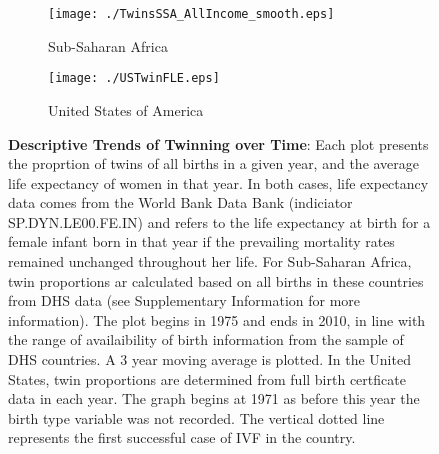 \documentclass{nature}
\begin{document}
\begin{linenumbers}
\begin{spacing}{1}
\begin{figure}[htpb!]
\begin{subfigure}{.5\textwidth}
  \texttt{[image: ./TwinsSSA\_AllIncome\_smooth.eps]}
   \caption{Sub-Saharan Africa}
\end{subfigure}%
\begin{subfigure}{.5\textwidth}
  \texttt{[image: ./USTwinFLE.eps]}
  \caption{United States of America}
\end{subfigure}
\caption{\textbf{Descriptive Trends of Twinning over Time}: {\footnotesize Each plot presents the proprtion of
twins of all births in a given year, and the average life expectancy of women in that year. In
both cases, life expectancy data comes from the World Bank Data Bank (indiciator SP.DYN.LE00.FE.IN) and refers to the life expectancy at birth for a female infant born in that year if the prevailing mortality rates remained unchanged throughout her life.  For Sub-Saharan Africa, twin proportions ar calculated based on all births in these countries from DHS data (see Supplementary Information for more information).  The plot begins in 1975 and ends in 2010, in line with the range of availaibility of birth information from the sample of DHS countries.  A 3 year moving average is plotted.  In the United States, twin proportions are determined from full birth certficate data in each year.  The graph begins at 1971 as before this year the birth type variable was not recorded.  The vertical dotted line represents the first successful case of IVF in the country.}}
\end{figure}

\clearpage
\thispagestyle{empty}








\clearpage


\end{spacing}
\end{linenumbers}
\end{document}
